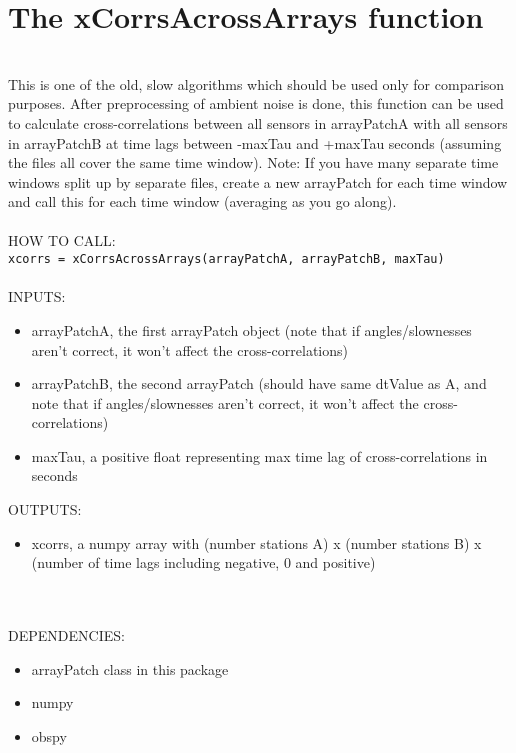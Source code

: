 \documentclass{article}
\begin{document}
\section{The xCorrsAcrossArrays function}
\\
This is one of the old, slow algorithms which should be used only for comparison purposes. After preprocessing of ambient noise is done, this function can be used to calculate cross-correlations between all sensors in arrayPatchA with all sensors in arrayPatchB at time lags between -maxTau and +maxTau seconds (assuming the files all cover the same time window). Note: If you have many separate time windows split up by separate files, create a new arrayPatch for each time window and call this for each time window (averaging as you go along).
\\
\\
HOW TO CALL:
\\
\texttt{xcorrs = xCorrsAcrossArrays(arrayPatchA, arrayPatchB, maxTau)}
\\
\\
INPUTS:
\begin{itemize}
    \item arrayPatchA, the first arrayPatch object (note that if angles/slownesses aren't correct, it won't affect the cross-correlations)
	\item arrayPatchB, the second arrayPatch (should have same dtValue as A, and note that if angles/slownesses aren't correct, it won't affect the cross-correlations)
	\item maxTau, a positive float representing max time lag of cross-correlations in seconds
\end{itemize}
OUTPUTS:
\begin{itemize}
    \item xcorrs, a numpy array with (number stations A) x (number stations B) x (number of time lags including negative, 0 and positive)
\end{itemize}
\\
\\
DEPENDENCIES: 
\begin{itemize}
    \item arrayPatch class in this package
    \item numpy
    \item obspy
\end{itemize}
\\
\\
\end{document}
